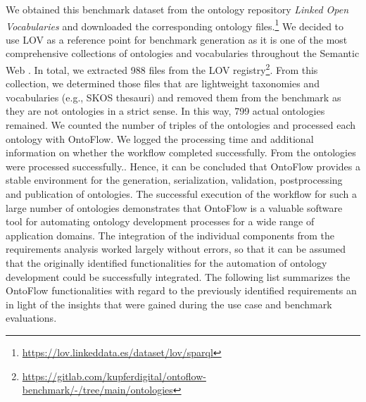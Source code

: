 \documentclass[sigconf]{acmart}
\begin{document}
We obtained this benchmark dataset from the ontology repository \textit{Linked Open Vocabularies} and downloaded the corresponding ontology files.\footnote{\url{https://lov.linkeddata.es/dataset/lov/sparql}} We decided to use LOV as a reference point for benchmark generation as it is one of the most comprehensive collections of ontologies and vocabularies throughout the Semantic Web \cite{lov}. In total, we extracted 988 files from the LOV registry\footnote{\url{https://gitlab.com/kupferdigital/ontoflow-benchmark/-/tree/main/ontologies}}. From this collection, we determined those files that are lightweight taxonomies and vocabularies (e.g., SKOS thesauri) and removed them from the benchmark as they are not ontologies in a strict sense. In this way, 799 actual ontologies remained. We counted the number of triples of the ontologies and processed each ontology with OntoFlow. We logged the processing time and additional information on whether the workflow completed successfully. From the  ontologies  were processed successfully.. Hence, it can be concluded that OntoFlow provides a stable environment for the generation, serialization, validation, postprocessing and publication of ontologies. The successful execution of the workflow for such a large number of ontologies demonstrates that OntoFlow is a valuable software tool for automating ontology development processes for a wide range of application domains. The integration of the individual components from the requirements analysis worked largely without errors, so that it can be assumed that the originally identified functionalities for the automation of ontology development could be successfully integrated. The following list summarizes the OntoFlow functionalities with regard to the previously identified requirements an in light of the insights that were gained during the use case and benchmark evaluations. 
\end{document}
